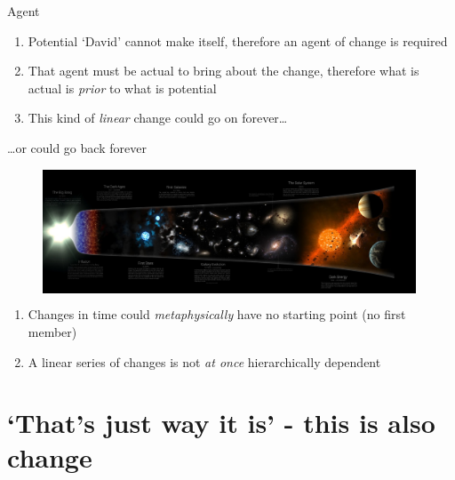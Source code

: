 \documentclass[xcolor=dvipsnames]{beamer}
\begin{document}
\begin{frame}[fragile]{Agent}
  \begin{enumerate}
  \item Potential `David' cannot make itself, therefore an agent of change is required \vspace{5mm}
  \item That agent must be actual to bring about the change, therefore what is actual is \emph{prior} to what is potential \vspace{5mm}
    \item This kind of \emph{linear} change could go on forever\ldots \vspace{5mm}
  \end{enumerate}
\end{frame}

\begin{frame}{\ldots or could go back forever}
\begin{figure}
  \centering
  \begin{columns}
    \centering
    \includegraphics[width=0.99\textwidth]{big_bang}
  \end{columns}
\end{figure}
  \begin{enumerate}
  \item Changes in time could \emph{metaphysically} have no starting point (no first member) \vspace{5mm}
  \item A linear series of changes is not \emph{at once} hierarchically dependent \vspace{5mm}
  \end{enumerate}
\end{frame}


\section{`That's just way it is' - this is also change}
\end{document}
